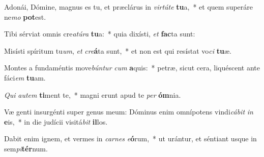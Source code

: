 \item Adonái, Dómine, magnus es tu, et præclárus in \textit{vir}\textit{tú}\textit{te} \textbf{tu}a,~* et quem superáre ne\textit{mo} \textbf{pot}est.
\item Tibi sérviat omnis cre\textit{a}\textit{tú}\textit{ra} \textbf{tu}a:~* quia dixísti, \textit{et} \textbf{fac}ta sunt:
\item Misísti spíritum tu\textit{um}, \textit{et} \textit{cre}\textbf{á}ta sunt,~* et non est qui resístat vo\textit{ci} \textbf{tu}æ.
\item Montes a fundaméntis move\textit{bún}\textit{tur} \textit{cum} \textbf{a}quis:~* petræ, sicut cera, liquéscent ante fáci\textit{em} \textbf{tu}am.
\item \textit{Qui} \textit{au}\textit{tem} \textbf{ti}ment te,~* magni erunt apud te \textit{per} \textbf{óm}nia.
\item Væ genti insurgénti super genus meum: Dóminus enim omnípotens vindi\textit{cá}\textit{bit} \textit{in} \textbf{e}is,~* in die judícii visitá\textit{bit} \textbf{il}los.
\item Dabit enim ignem, et vermes in \textit{car}\textit{nes} \textit{e}\textbf{ó}rum,~* ut urántur, et séntiant usque in sem\textit{pi}\textbf{tér}num.
